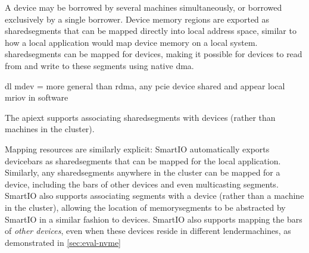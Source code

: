 %



\objdisaggregation*%
A device may be borrowed by several machines simultaneously, or borrowed exclusively by a single \gls{borrower}.
%
        Device memory regions are exported as \glspl{sharedsegment} that can be mapped directly into local address space, similar to how a local application would map device memory on a local system.
        \Glspl{sharedsegment} can be mapped for devices, making it possible for devices to read from and write to these \glspl{segment} using native \gls{dma}.

    dl mdev = more general than rdma, any pcie device shared and appear local
mriov in software

The \gls{apiext} supports associating \glspl{sharedsegment} with devices (rather than machines in the cluster).
%

        Mapping resources are similarly explicit: SmartIO automatically exports \glspl{devicebar} as \glspl{sharedsegment} that can be mapped for the local application.
        Similarly, any \glspl{sharedsegment} anywhere in the cluster can be mapped for a device, including the \glspl{bar} of other devices and even \gls{multicasting} \glspl{segment}.
        SmartIO also supports associating \glspl{segment} with a device (rather than a machine in the cluster), allowing the location of \glspl{memorysegment} to be abstracted by SmartIO in a similar fashion to devices.
SmartIO also supports mapping the \glspl{bar} of \emph{other devices}, even when these devices reside in different \glspl{lendermachine}, as 
%
demonstrated in \cref{sec:eval-nvme}
%


